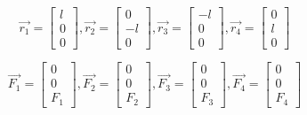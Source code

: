 \documentclass{article}
\begin{document}
\begin{equation}
\overrightarrow{r_1} = \left[\begin{array}{c} l \\ 0 \\ 0\end{array}\right],
\overrightarrow{r_2} = \left[\begin{array}{c} 0 \\ -l \\ 0\end{array}\right],
\overrightarrow{r_3} = \left[\begin{array}{c} -l \\ 0 \\ 0\end{array}\right],
\overrightarrow{r_4} = \left[\begin{array}{c} 0 \\ l \\ 0\end{array}\right]
\end{equation}

\begin{equation}
\overrightarrow{F_1} = \left[\begin{array}{c} 0 \\ 0 \\ F_1 \end{array}\right],
\overrightarrow{F_2} = \left[\begin{array}{c} 0 \\ 0 \\ F_2 \end{array}\right],
\overrightarrow{F_3} = \left[\begin{array}{c} 0 \\ 0 \\ F_3 \end{array}\right],
\overrightarrow{F_4} = \left[\begin{array}{c} 0 \\ 0 \\ F_4 \end{array}\right]
\end{equation}
\end{document}
